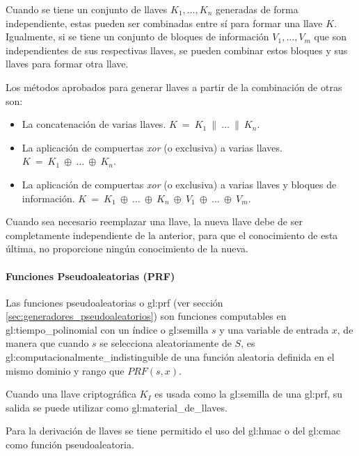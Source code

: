Cuando se tiene un conjunto de llaves $K_1, \dots, K_n$ generadas de forma
independiente, estas pueden ser combinadas entre sí para formar una llave $K$.
Igualmente, si se tiene un conjunto de bloques de información $V_1, \dots,
V_m$ que son independientes de sus respectivas llaves, se pueden combinar
estos bloques y sus llaves para formar otra llave.

Los métodos aprobados para generar llaves a partir de la combinación de
otras son:
\begin{itemize}

  \item La concatenación de varias llaves.
    $K\: =\: K_1\: \parallel\: \dots\: \parallel\: K_n$.

  \item La aplicación de compuertas \textit{xor} (o exclusiva) a varias llaves.
    $K\: =\: K_1\: \oplus\: \dots\: \oplus\: K_n$.

  \item La aplicación de compuertas \textit{xor} (o exclusiva) a varias llaves
    y bloques de información.
    $K\: =\: K_1\: \oplus\: \dots\: \oplus\: K_n\:
    \oplus\: V_1\: \oplus\: \dots\: \oplus\: V_m$.

\end{itemize}

Cuando sea necesario reemplazar una llave, la nueva llave debe de ser
completamente independiente de la anterior, para que el conocimiento de esta
última, no proporcione ningún conocimiento de la nueva.


\paragraph{Funciones Pseudoaleatorias (PRF)}

Las funciones pseudoaleatorias o \gls{gl:prf} (ver sección
\ref{sec:generadores_pseudoaleatorios}) son funciones computables en
\gls{gl:tiempo_polinomial} con un índice o \gls{gl:semilla} $s$ y una variable
de entrada $x$, de manera que cuando $s$ se selecciona aleatoriamente de $S$,
es \gls{gl:computacionalmente_indistinguible} de una función aleatoria
definida en el mismo dominio y rango que $PRF(s,x)$.

Cuando una llave criptográfica $K_I$ es usada como la \gls{gl:semilla} de una
\gls{gl:prf}, su salida se puede utilizar como \gls{gl:material_de_llaves}.

Para la derivación de llaves se tiene permitido el uso del \gls{gl:hmac} o
del \gls{gl:cmac} como función pseudoaleatoria.

